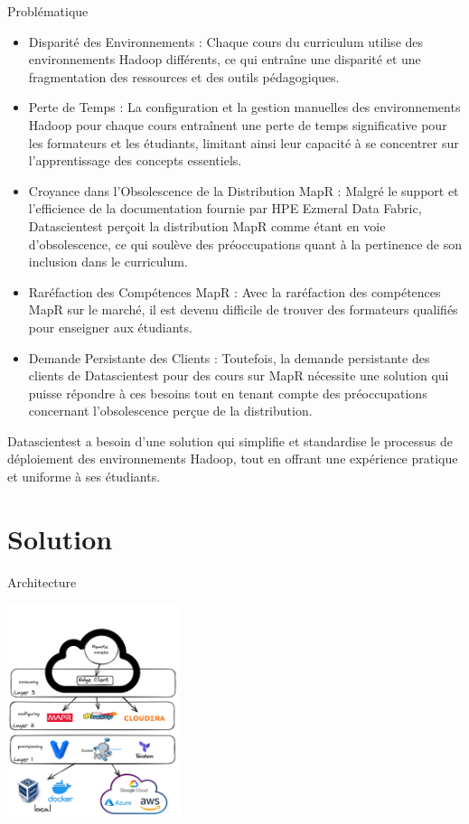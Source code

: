 \documentclass[tiny]{beamer}
\begin{document}
\begin{frame}[allowframebreaks, labels=]{Problématique}
\begin{itemize}
\item \alert{Disparité des Environnements :} Chaque cours du curriculum utilise des
environnements Hadoop différents, ce qui entraîne une disparité et une
fragmentation des ressources et des outils pédagogiques.
\item \alert{Perte de Temps :} La configuration et la gestion manuelles des
environnements Hadoop pour chaque cours entraînent une perte de temps
significative pour les formateurs et les étudiants, limitant ainsi leur
capacité à se concentrer sur l'apprentissage des concepts essentiels.
\item \alert{Croyance dans l'Obsolescence de la Distribution MapR :} Malgré le support et
l'efficience de la documentation fournie par HPE Ezmeral Data Fabric,
Datascientest perçoit la distribution MapR comme étant en voie
d'obsolescence, ce qui soulève des préoccupations quant à la pertinence de
son inclusion dans le curriculum.
\item \alert{Raréfaction des Compétences MapR :} Avec la raréfaction des compétences MapR
sur le marché, il est devenu difficile de trouver des formateurs qualifiés
pour enseigner aux étudiants.
\item \alert{Demande Persistante des Clients :} Toutefois, la demande persistante des
clients de Datascientest pour des cours sur MapR nécessite une solution qui
puisse répondre à ces besoins tout en tenant compte des préoccupations
concernant l'obsolescence perçue de la distribution.
\end{itemize}

Datascientest a besoin d'une solution qui simplifie et standardise le
processus de déploiement des environnements Hadoop, tout en offrant une
expérience pratique et uniforme à ses étudiants.
\end{frame}


\section{Solution}
\label{sec:org76cf1c0}

\begin{frame}[label={sec:org973f791}]{Architecture}
\begin{center}
\includegraphics[width=5cm]{../../media/archi.png}
\end{center}
\end{frame}
\end{document}
